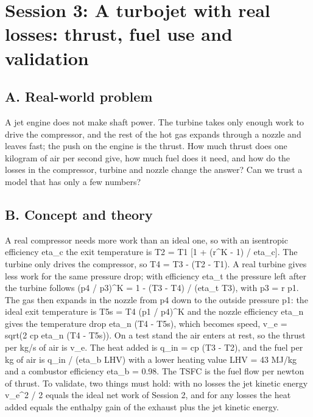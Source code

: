 \documentclass[11pt,a4paper]{article}
\begin{document}
\section{Session 3: A turbojet with real losses: thrust, fuel use and validation}

\subsection*{A. Real-world problem}
A jet engine does not make shaft power. The turbine takes only enough work to drive the compressor, and the rest of the hot gas expands through a nozzle and leaves fast; the push on the engine is the thrust. How much thrust does one kilogram of air per second give, how much fuel does it need, and how do the losses in the compressor, turbine and nozzle change the answer? Can we trust a model that has only a few numbers?

\subsection*{B. Concept and theory}
A real compressor needs more work than an ideal one, so with an isentropic efficiency eta\_c the exit temperature is T2 = T1 [1 + (r\textasciicircum{}K - 1) / eta\_c]. The turbine only drives the compressor, so T4 = T3 - (T2 - T1). A real turbine gives less work for the same pressure drop; with efficiency eta\_t the pressure left after the turbine follows (p4 / p3)\textasciicircum{}K = 1 - (T3 - T4) / (eta\_t T3), with p3 = r p1. The gas then expands in the nozzle from p4 down to the outside pressure p1: the ideal exit temperature is T5s = T4 (p1 / p4)\textasciicircum{}K and the nozzle efficiency eta\_n gives the temperature drop eta\_n (T4 - T5s), which becomes speed, v\_e = sqrt(2 cp eta\_n (T4 - T5s)). On a test stand the air enters at rest, so the thrust per kg/s of air is v\_e. The heat added is q\_in = cp (T3 - T2), and the fuel per kg of air is q\_in / (eta\_b LHV) with a lower heating value LHV = 43 MJ/kg and a combustor efficiency eta\_b = 0.98. The TSFC is the fuel flow per newton of thrust. To validate, two things must hold: with no losses the jet kinetic energy v\_e\textasciicircum{}2 / 2 equals the ideal net work of Session 2, and for any losses the heat added equals the enthalpy gain of the exhaust plus the jet kinetic energy.
\end{document}
